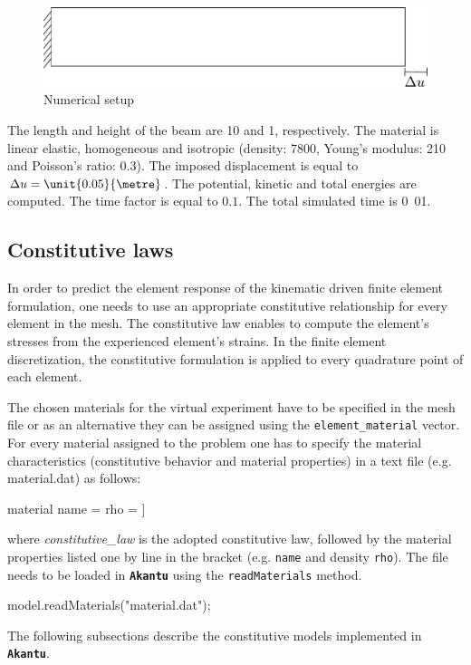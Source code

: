 \documentclass[a4paper,11pt]{book}
\newcommand{\akantu}{{\texttt{\textbf{Akantu}}}\xspace}
\newcommand{\code}[1]{\texttt{#1}}
\begin{document}
\begin{figure}[!htb]
  \centering
  \includegraphics[scale=.6]{figures/explicit_dynamic}
  \caption{Numerical setup \label{fig:smm:explicit}}
\end{figure}

The length  and height of  the beam are \unit{10}{\metre}  and \unit{1}{\metre},
respectively.   The  material  is  linear  elastic,  homogeneous  and  isotropic
(density:       \unit{7800}{\kilogrampercubicmetre},       Young's      modulus:
\unit{210}{\giga\pascal} and Poisson's  ratio: $0.3$).  The imposed displacement
is equal to  $\Delta u = \unit{0.05}{\metre}$. The  potential, kinetic and
total  energies are  computed.  The  time factor  is equal  to $0.1$.  The total
simulated time is \unit{0.01}{\second}.

\subsection{Constitutive laws}
In order to predict the element response of the kinematic driven finite element formulation, one needs to use an appropriate constitutive relationship for every element in the mesh. The constitutive law enables to compute the element's stresses from the experienced element's strains. In the finite element discretization, the constitutive formulation is applied to every quadrature point of each element.

The chosen materials for the virtual experiment have to be specified in the mesh file or as an alternative they can be assigned using the \code{element\_material} vector.
For every material assigned to the problem one has to specify the material characteristics (constitutive behavior and material properties) in a text file (e.g. material.dat) as follows:
\begin{cpp}
material %
	 name = %
	 rho = %
]

\end{cpp}
where \emph{constitutive\_law} is the adopted constitutive law, followed by the material properties listed one by line in the bracket (e.g. \code{name} and density \code{rho}). The file needs to be loaded in \akantu using the \code{readMaterials} method.
\begin{cpp}
  model.readMaterials("material.dat");
\end{cpp}
The following subsections describe the constitutive models implemented in \akantu.
\end{document}
